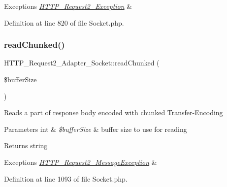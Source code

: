 \begin{DoxyExceptions}{Exceptions}
{\em \hyperlink{classHTTP__Request2__Exception}{H\+T\+T\+P\+\_\+\+Request2\+\_\+\+Exception}} & \\
\hline
\end{DoxyExceptions}


Definition at line 820 of file Socket.\+php.

\mbox{\label{classHTTP__Request2__Adapter__Socket_a2a5a784d7631133a5713476ee96c62ed}} 
\subsubsection{\texorpdfstring{read\+Chunked()}{readChunked()}}
{\footnotesize\ttfamily H\+T\+T\+P\+\_\+\+Request2\+\_\+\+Adapter\+\_\+\+Socket\+::read\+Chunked (\begin{DoxyParamCaption}\item[{}]{\$buffer\+Size }\end{DoxyParamCaption})\hspace{0.3cm}{\ttfamily [protected]}}

Reads a part of response body encoded with chunked Transfer-\/\+Encoding


\begin{DoxyParams}[1]{Parameters}
int & {\em \$buffer\+Size} & buffer size to use for reading\\
\hline
\end{DoxyParams}
\begin{DoxyReturn}{Returns}
string 
\end{DoxyReturn}

\begin{DoxyExceptions}{Exceptions}
{\em \hyperlink{classHTTP__Request2__MessageException}{H\+T\+T\+P\+\_\+\+Request2\+\_\+\+Message\+Exception}} & \\
\hline
\end{DoxyExceptions}


Definition at line 1093 of file Socket.\+php.

\mbox{\label{classHTTP__Request2__Adapter__Socket_ace322a437e3d44b48bd44c2d452e0ad0}} 
